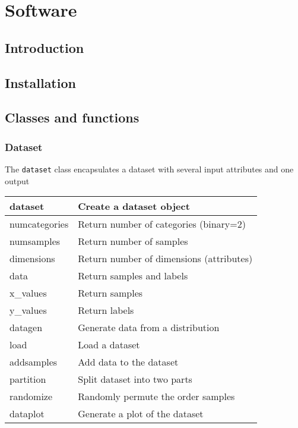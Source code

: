 

\chapter{Software}
\label{appendix:software}

\section{Introduction}

\section{Installation}

\section{Classes and functions}

\subsection{Dataset}
The {\tt dataset} class encapsulates a dataset with several input
attributes and one output 

\begin{tabular}{ll}
\hline
dataset 	& Create a dataset object \\
\hline
numcategories 	& Return number of categories (binary=2)\\
numsamples 	& Return number of samples \\
dimensions	& Return number of dimensions (attributes) \\
\hline
data		& Return samples and labels \\
x\_values	& Return samples \\
y\_values	& Return labels \\
\hline
datagen		& Generate data from a distribution \\
load		& Load a dataset \\
addsamples	& Add data to the dataset \\
\hline
partition	& Split dataset into two parts \\
randomize	& Randomly permute the order samples \\
\hline
dataplot	& Generate a plot of the dataset \\
\hline
\end{tabular}

